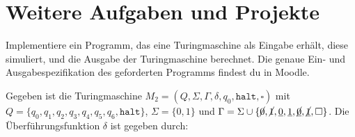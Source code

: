 \documentclass{uebung_cs}
\begin{document}
\section*{Weitere Aufgaben und Projekte}

\begin{exercise}
	Implementiere ein Programm, das eine Turingmaschine als Eingabe erhält, diese simuliert, und die Ausgabe der Turingmaschine berechnet. Die genaue Ein- und Ausgabespezifikation des geforderten Programms findest du in Moodle.
\end{exercise}

\begin{exercise}
	Gegeben ist die Turingmaschine $M_2 = (Q,\Sigma,\Gamma,\delta,q_0,\mathtt{halt},\square)$ mit\\
	$Q = \{q_0,q_1,q_2,q_3,q_4,q_5,q_6,\mathtt{halt}\}$, $\Sigma = \{0,1\}$ und $\Gamma = \Sigma \cup \{\cancel{0},\cancel{1},\underline{0},\underline{1},\underline{\cancel{0}},\underline{\cancel{1}},\square\}$.
	Die Überführungsfunktion $\delta$ ist gegeben durch:


\end{exercise}
\end{document}
